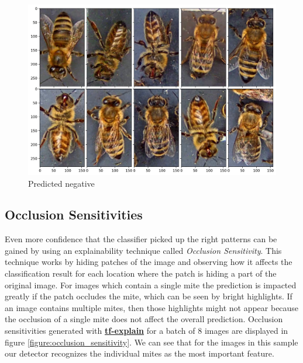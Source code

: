 \documentclass[12pt,a4paper]{article}
\begin{document}
\begin{figure}[H]
\centering
\includegraphics[width=13.5cm]{samples_negative.png}
\caption{Predicted negative}
\label{figure:negative_predictions}
\end{figure}

\subsection{Occlusion Sensitivities}

Even more confidence that the classifier picked up the right patterns can be gained by using an explainability technique called \textit{Occlusion Sensitivity}. This technique works by hiding patches of the image and observing how it affects the classification result for each location where the patch is hiding a part of the original image. For images which contain a single mite the prediction is impacted greatly if the patch occludes the mite, which can be seen by bright highlights. If an image contains multiple mites, then those highlights might not appear because the occlusion of a single mite does not affect the overall prediction.  Occlusion sensitivities generated with \href{https://github.com/sicara/tf-explain}{\textbf{tf-explain}} for a batch of $8$ images are displayed in figure \ref{figure:occlusion_sensitivity}. We can see that for the images in this sample our detector recognizes the individual mites as the most important feature.
\end{document}
